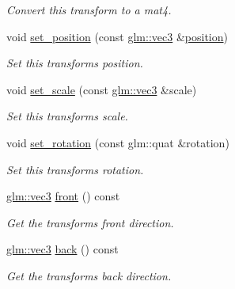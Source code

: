 \begin{DoxyCompactItemize}
\begin{DoxyCompactList}\small\item\em Convert this transform to a mat4. \end{DoxyCompactList}\item 
void \mbox{\hyperlink{classmoka_1_1transform_ab0101bcceca6791ce8a60b20116455b1}{set\+\_\+position}} (const \mbox{\hyperlink{namespacemoka_aed2224bc0e5b79e57a8975ded94ee1aaa97ade28e93c0de60adc075bdbe07ca36}{glm\+::vec3}} \&\mbox{\hyperlink{namespacemoka_a16a7bd7fc66f698dfcaf9bca1312a2bba4757fe07fd492a8be0ea6a760d683d6e}{position}})
\begin{DoxyCompactList}\small\item\em Set this transform\textquotesingle{}s position. \end{DoxyCompactList}\item 
void \mbox{\hyperlink{classmoka_1_1transform_a2c047551ab0948aa8400f86d357619ce}{set\+\_\+scale}} (const \mbox{\hyperlink{namespacemoka_aed2224bc0e5b79e57a8975ded94ee1aaa97ade28e93c0de60adc075bdbe07ca36}{glm\+::vec3}} \&scale)
\begin{DoxyCompactList}\small\item\em Set this transform\textquotesingle{}s scale. \end{DoxyCompactList}\item 
void \mbox{\hyperlink{classmoka_1_1transform_a53721bd0d33ca0b20fc76132d0b6457b}{set\+\_\+rotation}} (const glm\+::quat \&rotation)
\begin{DoxyCompactList}\small\item\em Set this transform\textquotesingle{}s rotation. \end{DoxyCompactList}\item 
\mbox{\hyperlink{namespacemoka_aed2224bc0e5b79e57a8975ded94ee1aaa97ade28e93c0de60adc075bdbe07ca36}{glm\+::vec3}} \mbox{\hyperlink{classmoka_1_1transform_ac7a59896b1574f7ce6ce9b7e9534fbd9}{front}} () const
\begin{DoxyCompactList}\small\item\em Get the transform\textquotesingle{}s front direction. \end{DoxyCompactList}\item 
\mbox{\hyperlink{namespacemoka_aed2224bc0e5b79e57a8975ded94ee1aaa97ade28e93c0de60adc075bdbe07ca36}{glm\+::vec3}} \mbox{\hyperlink{classmoka_1_1transform_a2604b09d17efee979a6180763860ed81}{back}} () const
\begin{DoxyCompactList}\small\item\em Get the transform\textquotesingle{}s back direction. \end{DoxyCompactList}\item 

\end{DoxyCompactItemize}
